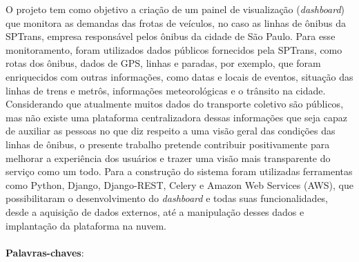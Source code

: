 \begin{resumo}
\indent
\par O projeto tem como objetivo a criação de um painel de visualização (\textit{dashboard}) que monitora as demandas das   frotas   de veículos, no caso as linhas de ônibus da SPTrans, empresa responsável pelos ônibus da cidade de São Paulo. Para esse monitoramento, foram utilizados dados públicos fornecidos pela SPTrans, como rotas dos ônibus, dados de GPS, linhas e paradas, por exemplo, que foram enriquecidos com outras informações, como datas e locais de eventos, situação das linhas de trens e metrôs, informações meteorológicas e o trânsito na cidade. Considerando que atualmente muitos dados do transporte coletivo são públicos, mas não existe uma plataforma centralizadora dessas informações que seja capaz de auxiliar as pessoas no que diz respeito a uma visão geral das condições das linhas de ônibus, o presente trabalho pretende contribuir positivamente para melhorar a experiência dos usuários e trazer uma visão mais transparente do serviço como um todo. Para a construção do sistema foram utilizadas ferramentas como Python, Django, Django-REST, Celery e Amazon Web Services (AWS), que possibilitaram o desenvolvimento do \textit{dashboard} e todas suas funcionalidades, desde a aquisição de dados externos, até a manipulação desses dados e implantação da plataforma na nuvem.
\\
\\
\textbf{Palavras-chaves}: ~

\end{resumo}
